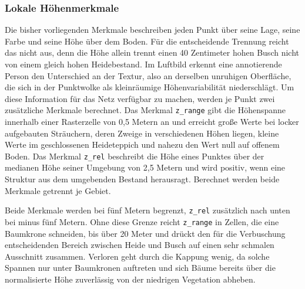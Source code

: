
\subsubsection{Lokale Höhenmerkmale}\label{hoehenmerkmale}

Die bisher vorliegenden Merkmale beschreiben jeden Punkt über seine Lage, seine Farbe und seine Höhe über dem Boden. Für die entscheidende Trennung reicht das nicht aus, denn die Höhe allein trennt einen 40 Zentimeter hohen Busch nicht von einem gleich hohen Heidebestand. Im Luftbild erkennt eine annotierende Person den Unterschied an der Textur, also an derselben unruhigen Oberfläche, die sich in der Punktwolke als kleinräumige Höhenvariabilität niederschlägt. Um diese Information für das Netz verfügbar zu machen, werden je Punkt zwei zusätzliche Merkmale berechnet. Das Merkmal \texttt{z\_range} gibt die Höhenspanne innerhalb einer Rasterzelle von 0,5 Metern an und erreicht große Werte bei locker aufgebauten Sträuchern, deren Zweige in verschiedenen Höhen liegen, kleine Werte im geschlossenen Heideteppich und nahezu den Wert null auf offenem Boden. Das Merkmal \texttt{z\_rel} beschreibt die Höhe eines Punktes über der medianen Höhe seiner Umgebung von 2,5 Metern und wird positiv, wenn eine Struktur aus dem umgebenden Bestand herausragt. Berechnet werden beide Merkmale getrennt je Gebiet.

Beide Merkmale werden bei fünf Metern begrenzt, \texttt{z\_rel} zusätzlich nach unten bei minus fünf Metern. Ohne diese Grenze reicht \texttt{z\_range} in Zellen, die eine Baumkrone schneiden, bis über 20 Meter und drückt den für die Verbuschung entscheidenden Bereich zwischen Heide und Busch auf einen sehr schmalen Ausschnitt zusammen. Verloren geht durch die Kappung wenig, da solche Spannen nur unter Baumkronen auftreten und sich Bäume bereits über die normalisierte Höhe zuverlässig von der niedrigen Vegetation abheben.

